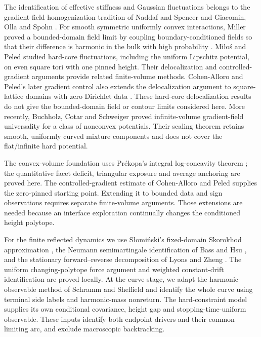 \documentclass[11pt]{article}
\theoremstyle{definition}
\theoremstyle{remark}
\numberwithin{equation}{section}
\begin{document}
The identification of effective stiffness and Gaussian fluctuations
belongs to the gradient-field homogenization tradition of Naddaf and
Spencer \cite{NaddafSpencer} and Giacomin, Olla and Spohn
\cite{GiacominOllaSpohn}. For smooth symmetric uniformly convex interactions,
Miller proved a bounded-domain field limit by coupling boundary-conditioned
fields so that their difference is harmonic in the bulk with high probability
\cite{MillerField}. Mi\l o\'s and Peled \cite{MilosPeled}
studied hard-core fluctuations, including the uniform Lipschitz
potential, on even square tori with one pinned height. Their
delocalization and controlled-gradient arguments provide related
finite-volume methods. Cohen-Alloro and Peled's later gradient control
also extends the delocalization argument to square-lattice domains with
zero Dirichlet data \cite[Section~6]{CAP}. These hard-core delocalization
results do not give the
bounded-domain field or contour limits considered here. More recently, Buchholz, Cotar and
Schweiger \cite{BuchholzCotarSchweiger} proved infinite-volume
gradient-field universality for a class of nonconvex potentials.
Their scaling theorem retains smooth, uniformly curved mixture
components and does not cover the flat/infinite hard potential.

The convex-volume foundation uses Pr\'ekopa's integral log-concavity
theorem \cite{Prekopa}; the quantitative facet deficit, triangular
exposure and average anchoring are proved here. The controlled-gradient
estimate of Cohen-Alloro and Peled \cite{CAP} supplies the zero-pinned
starting point. Extending it to bounded data and sign observations
requires separate finite-volume arguments. Those extensions are needed
because an interface exploration continually changes the conditioned
height polytope.

For the finite reflected dynamics we use S\l omi\'nski's fixed-domain
Skorokhod approximation \cite{Slominski}, the Neumann semimartingale
identification of Bass and Hsu \cite{BassHsu}, and the stationary
forward--reverse decomposition of Lyons and Zheng \cite{LyonsZheng}.
The uniform changing-polytope force argument and weighted constant-drift
identification are proved locally. At the curve stage, we adapt the
harmonic-observable method of Schramm and Sheffield \cite{SSdiscrete}
and identify the whole curve using terminal side labels and
harmonic-mass nonreturn. The hard-constraint model supplies its own
conditional covariance, height gap and stopping-time-uniform observable.
These inputs identify both endpoint drivers and their common limiting
arc, and exclude macroscopic backtracking.
\end{document}
